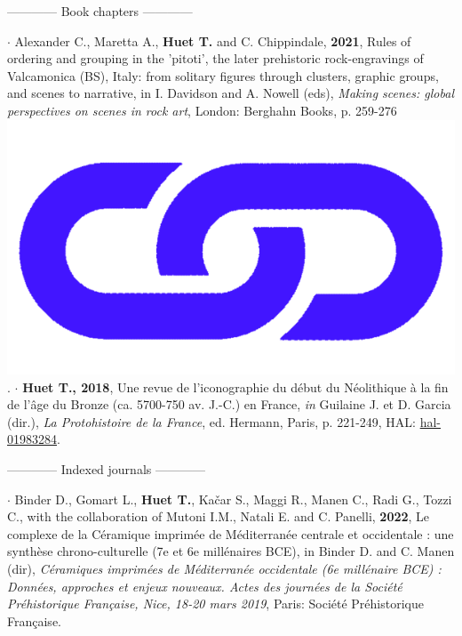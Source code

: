 \documentclass{article}
\begin{document}
\bigbreak
\begin{center}------------ Book chapters ------------\end{center}
\smallbreak
$\cdot$ Alexander C., Maretta A., \textbf{Huet T.} and C. Chippindale, \textbf{2021}, Rules of ordering and grouping in the 'pitoti', the later prehistoric rock-engravings of Valcamonica (BS), Italy: from solitary figures through clusters, graphic groups, and scenes to narrative, in I. Davidson and A. Nowell (eds), \textit{Making scenes: global perspectives on scenes in rock art}, London: Berghahn Books, p. 259-276 \href{https://www.berghahnbooks.com/title/DavidsonMaking}{\includegraphics[scale=0.02]{link_darkblue.png}}.
\smallbreak
$\cdot$ \textbf{Huet T., 2018}, Une revue de l'iconographie du d\'{e}but du N\'{e}olithique \`{a} la fin de l'\^{a}ge du Bronze (ca. 5700-750 av. J.-C.) en France, \textit{in} Guilaine J. et D. Garcia (dir.), \textit{La Protohistoire de la France}, ed. Hermann, Paris, p. 221-249, HAL: \href{https://hal.archives-ouvertes.fr/hal-01983284}{hal-01983284}.
\bigbreak
\begin{center}------------ Indexed journals ------------\end{center}
\smallbreak
$\cdot$ Binder D., Gomart L., \textbf{Huet T.}, Ka{\v{c}}ar S., Maggi R., Manen C., Radi G., Tozzi C., with the collaboration of Mutoni I.M., Natali E. and C. Panelli, \textbf{2022}, Le complexe de la C\'{e}ramique imprim\'{e}e de M\'{e}diterran\'{e}e centrale et occidentale : une synthèse chrono-culturelle (7e et 6e millénaires BCE), in Binder D. and C. Manen (dir), \textit{C\'{e}ramiques imprim\'{e}es de M\'{e}diterran\'{e}e occidentale (6e mill\'{e}naire BCE) : Donn\'{e}es, approches et enjeux nouveaux. Actes des journ\'{e}es de la Soci\'{e}t\'{e} Pr\'{e}historique Fran\c{c}aise, Nice, 18-20 mars 2019}, Paris: Soci\'{e}t\'{e} Pr\'{e}historique Fran\c{c}aise.
\end{document}
